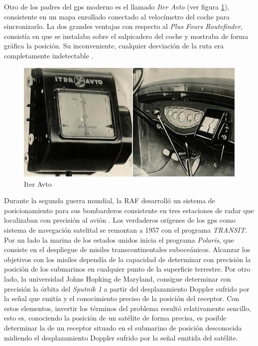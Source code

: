 Otro de los padres del gps moderno es el llamado \textit{Iter Avto} (ver figura \ref{fig:iter_avto}), consistente en un mapa enrollado conectado al velocímetro del coche para sincronizarlo. La dos grandes ventajas con respecto al \textit{Plus Fours Routefinder}, consistía en que se instalaba sobre el salpicadero del coche y mostraba de forma gráfica la posición. Su inconveniente, cualquier desviación de la ruta era completamente indetectable \cite{Parra13}.

\begin{figure}[hbtp]
\centering
\includegraphics[scale=0.5, fbox={\fboxrule} 4mm]{images/03-antecedentes/08-iter_avto.png}
\caption{Iter Avto}
\label{fig:iter_avto}
\end{figure}

Durante la segunda guerra mundial, la \ac{RAF} desarrolló un sistema de
posicionamiento para sus bombarderos consistente en tres estaciones de radar que localizaban
con precisión al avión \cite{Ori13}.
Los verdaderos orígenes de los gps como sistema de navegación satelital se remontan a 1957 con
el programa \textit{TRANSIT}. Por un lado la marina de los estados unidos inicia el programa \textit{Polaris},
que consiste en el despliegue de misiles transcontinentales suboceánicos. Alcanzar los objetivos
con los misiles dependía de la capacidad de determinar con precisión la posición de los
submarinos en cualquier punto de la superficie terrestre. Por otro lado, la universidad Johns
Hopking de Maryland, consigue determinar con precisión la órbita del \textit{Sputnik 1} a partir del
desplazamiento Doppler sufrido por la señal que emitía y el conocimiento preciso de la posición
del receptor. Con estos elementos, invertir los términos del problema resultó relativamente
sencillo, esto es, conociendo la posición de un satélite de forma precisa, es posible determinar
la de un receptor situado en el submarino de posición desconocida midiendo el desplazamiento
Doppler sufrido por la señal emitida del satélite.

